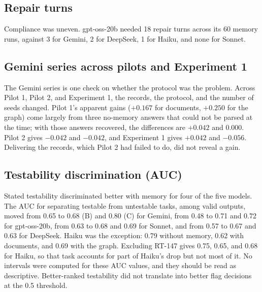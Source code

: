 \documentclass[11pt]{article}
\begin{document}
\subsection*{Repair turns}

Compliance was uneven. gpt-oss-20b needed 18 repair turns across its 60 memory runs, against 3 for Gemini, 2 for DeepSeek, 1 for Haiku, and none for Sonnet.


\subsection*{Gemini series across pilots and Experiment 1}

The Gemini series is one check on whether the protocol was the problem. Across Pilot 1, Pilot 2, and Experiment 1, the records, the protocol, and the number of seeds changed. Pilot 1's apparent gains ($+0.167$ for documents, $+0.250$ for the graph) come largely from three no-memory answers that could not be parsed at the time; with those answers recovered, the differences are $+0.042$ and $0.000$. Pilot 2 gives $-0.042$ and $-0.042$, and Experiment 1 gives $+0.042$ and $-0.056$. Delivering the records, which Pilot 2 had failed to do, did not reveal a gain.

\subsection*{Testability discrimination (AUC)}

Stated testability discriminated better with memory for four of the five models. The AUC for separating testable from untestable tasks, among valid outputs, moved from 0.65 to 0.68 (B) and 0.80 (C) for Gemini, from 0.48 to 0.71 and 0.72 for gpt-oss-20b, from 0.63 to 0.68 and 0.69 for Sonnet, and from 0.57 to 0.67 and 0.63 for DeepSeek. Haiku was the exception: 0.79 without memory, 0.62 with documents, and 0.69 with the graph. Excluding RT-147 gives 0.75, 0.65, and 0.68 for Haiku, so that task accounts for part of Haiku's drop but not most of it. No intervals were computed for these AUC values, and they should be read as descriptive. Better-ranked testability did not translate into better flag decisions at the 0.5 threshold.
\end{document}
